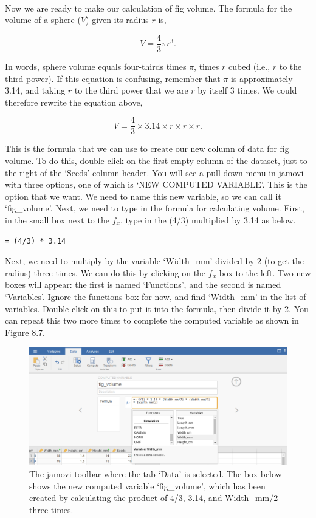 \documentclass[
  openany]{krantz}
\begin{document}
\begin{verbatim}




\end{verbatim}

Now we are ready to make our calculation of fig volume.
The formula for the volume of a sphere (\(V\)) given its radius \(r\) is,

\[V = \frac{4}{3} \pi r^{3}.\]

In words, sphere volume equals four-thirds times \(\pi\), times \(r\) cubed (i.e., \(r\) to the third power).
If this equation is confusing, remember that \(\pi\) is approximately 3.14, and taking \(r\) to the third power  that we are  \(r\) by itself 3 times.
We could therefore rewrite the equation above,

\[V = \frac{4}{3} \times 3.14 \times r \times r \times r.\]

This is the formula that we can use to create our new column of data for fig volume.
To do this, double-click on the first empty column of the dataset, just to the right of the `Seeds' column header.
You will see a pull-down menu in jamovi with three options, one of which is `NEW COMPUTED VARIABLE'.
This is the option that we want.
We need to name this new variable, so we can call it `fig\_volume'.
Next, we need to type in the formula for calculating volume.
First, in the small box next to the \(f_{x}\), type in the (4/3) multiplied by 3.14 as below.

\begin{verbatim}
= (4/3) * 3.14
\end{verbatim}

Next, we need to multiply by the variable `Width\_mm' divided by 2 (to get the radius) three times.
We can do this by clicking on the \(f_{x}\) box to the left.
Two new boxes will appear: the first is named `Functions', and the second is named `Variables'.
Ignore the functions box for now, and find `Width\_mm' in the list of variables.
Double-click on this to put it into the formula, then divide it by 2.
You can repeat this two more times to complete the computed variable as shown in Figure 8.7.

\begin{figure}
\includegraphics[width=1\linewidth]{img/jamovi_compute_new_variable} \caption{The jamovi toolbar where the tab `Data' is selected. The box below shows the new computed variable `fig\_volume', which has been created by calculating the product of 4/3, 3.14, and Width\_mm/2 three times.}\label{fig:unnamed-chunk-32}
\end{figure}
\end{document}
